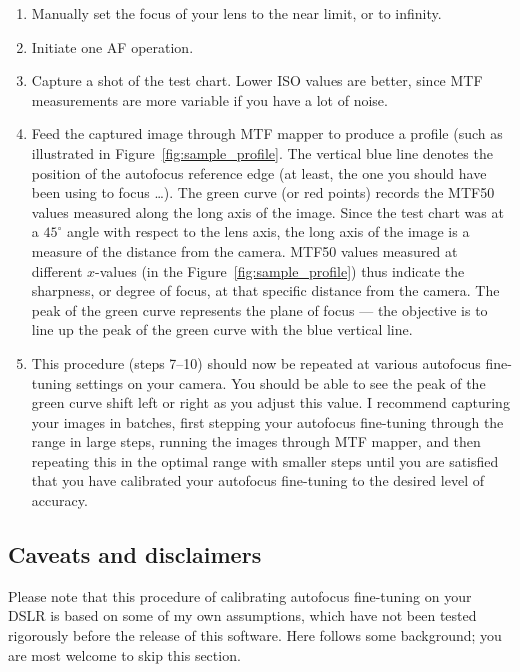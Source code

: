 \documentclass[a4paper]{article}
\begin{document}
\begin{enumerate}
    \item Manually set the focus of your lens to the near limit, or to
infinity.

    \item Initiate one AF operation.
   
    \item Capture a shot of the test chart. Lower ISO values are better, since MTF
measurements are more variable if you have a lot of noise.

    \item Feed the captured image through MTF mapper to produce a profile
(such as illustrated in Figure~\ref{fig:sample_profile}. The vertical blue
line denotes the position of the autofocus reference edge (at least, the one
you should have been using to focus \ldots). The green curve (or red
points) records the MTF50 values measured along the long axis of the image.
Since the test chart was at a $45^\circ$ angle with respect to the lens
axis, the long axis of the image is a measure of the distance from the
camera. MTF50 values measured at different $x$-values (in the
Figure~\ref{fig:sample_profile}) thus indicate the
sharpness, or degree of focus, at that specific distance from the camera.
The peak of the green curve represents the plane of focus --- the objective
is to line up the peak of the green curve with the blue vertical line.

    \item This procedure (steps 7--10) should now be repeated at various autofocus
fine-tuning settings on your camera. You should be able to see the peak of
the green curve shift left or right as you adjust this value. I recommend
capturing your images in batches, first stepping your autofocus fine-tuning
through the range in large steps, running the images through MTF mapper, and
then repeating this in the optimal range with smaller steps until you are
satisfied that you have calibrated your autofocus fine-tuning to the desired
level of accuracy.
\end{enumerate}

\subsection{Caveats and disclaimers}
Please note that this procedure of calibrating autofocus fine-tuning on your
DSLR is based on some of my own assumptions, which have not been tested
rigorously before the release of this software. Here follows some
background; you are most welcome to skip this section.
\end{document}
